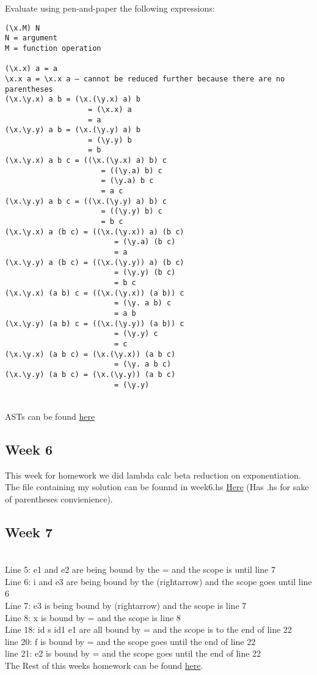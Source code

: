 \documentclass{article}
\theoremstyle{theorem}
\theoremstyle{definition}
\theoremstyle{remark}
\begin{document}
Evaluate using pen-and-paper the following expressions:
\begin{lstlisting}
(\x.M) N
N = argument
M = function operation

(\x.x) a = a
\x.x a = \x.x a — cannot be reduced further because there are no parentheses
(\x.\y.x) a b = (\x.(\y.x) a) b
                   = (\x.x) a
                   = a
(\x.\y.y) a b = (\x.(\y.y) a) b
                   = (\y.y) b
                   = b
(\x.\y.x) a b c = ((\x.(\y.x) a) b) c
                      = ((\y.a) b) c
                      = (\y.a) b c
                      = a c
(\x.\y.y) a b c = ((\x.(\y.y) a) b) c
                      = ((\y.y) b) c
                      = b c
(\x.\y.x) a (b c) = ((\x.(\y.x)) a) (b c)
                         = (\y.a) (b c)
                         = a
(\x.\y.y) a (b c) = ((\x.(\y.y)) a) (b c)
                         = (\y.y) (b c)
                         = b c
(\x.\y.x) (a b) c = ((\x.(\y.x)) (a b)) c
                         = (\y. a b) c
                         = a b
(\x.\y.y) (a b) c = ((\x.(\y.y)) (a b)) c
                         = (\y.y) c
                         = c
(\x.\y.x) (a b c) = (\x.(\y.x)) (a b c)
                         = (\y. a b c)
(\x.\y.y) (a b c) = (\x.(\y.y)) (a b c)
                         = (\y.y)
\end{lstlisting}
\\ASTs can be found \href{https://github.com/jacgoldberg/Programming-Lang/blob/main/Note%20Dec%2019%2C%202022%20(2).pdf}{here}

\subsection{Week 6}

This week for homework we did lambda calc beta reduction on exponentiation. The file containing my solution can be founnd in week6.hs \href{https://github.com/jacgoldberg/Programming-Lang/blob/main/week6.hs}{Here} (Has .hs for sake of parentheses convienience).

\subsection{Week 7}
\\Line 5: e1 and e2 are being bound by the = and the scope is until line 7
\\Line 6: i and e3 are being bound by the (rightarrow) and the scope goes until line 6
\\Line 7: e3 is being bound by (rightarrow) and the scope is line 7
\\Line 8: x is bound by = and the scope is line 8
\\Line 18: id s id1 e1 are all bound by = and the scope is to the end of line 22
\\line 20: f is bound by = and the scope goes until the end of line 22
\\line 21: e2 is bound by = and the scope goes until the end of line 22
\\The Rest of this weeks homework can be found \href{https://github.com/jacgoldberg/Programming-Lang/blob/main/Note%20Oct%2019%2C%202022.pdf}{here}.
\end{document}
